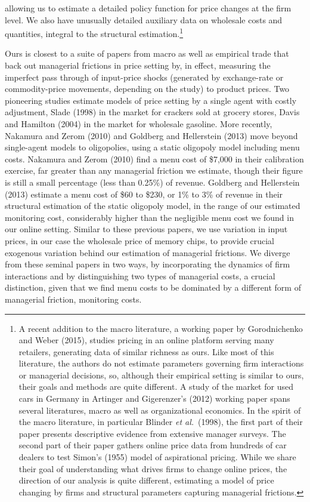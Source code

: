 \documentclass[11pt]{article}
\begin{document}
\begin{spacing}{1.3}
allowing us to estimate a detailed policy function for price changes
at the firm level. We also have unusually detailed auxiliary data on
wholesale costs and quantities, integral to the structural
estimation.\footnote{A recent addition to the macro literature, a
  working paper by Gorodnichenko and Weber (2015), studies pricing in
  an online platform serving many retailers, generating data of
  similar richness as ours. Like most of this literature, the authors
  do not estimate parameters governing firm interactions or managerial
  decisions, so, although their empirical setting is similar to ours,
  their goals and methods are quite different. A study of the market
  for used cars in Germany in Artinger and Gigerenzer's (2012) working
  paper spans several literatures, macro as well as organizational
  economics. In the spirit of the macro literature, in particular
  Blinder {\em et al.}\ (1998), the first part of their paper presents
  descriptive evidence from extensive manager surveys. The second part
  of their paper gathers online price data from hundreds of car
  dealers to test Simon's (1955) model of aspirational pricing. While
  we share their goal of understanding what drives firms to change
  online prices, the direction of our analysis is quite different,
  estimating a model of price changing by firms and structural
  parameters capturing managerial frictions.}

Ours is closest to a suite of papers from macro as well as empirical
trade that back out managerial frictions in price setting by, in
effect, measuring the imperfect pass through of input-price shocks
(generated by exchange-rate or commodity-price movements, depending on
the study) to product prices.  Two pioneering studies estimate models
of price setting by a single agent with costly adjustment, Slade
(1998) in the market for crackers sold at grocery stores, Davis and
Hamilton (2004) in the market for wholesale gasoline.  More recently,
Nakamura and Zerom (2010) and Goldberg and Hellerstein (2013) move
beyond single-agent models to oligopolies, using a static oligopoly
model including menu costs. Nakamura and Zerom (2010) find a menu cost
of \$7,000 in their calibration exercise, far greater than any
managerial friction we estimate, though their figure is still a small
percentage (less than 0.25\%) of revenue. Goldberg and Hellerstein
(2013) estimate a menu cost of \$60 to \$230, or 1\% to 3\% of revenue
in their structural estimation of the static oligopoly model, in the
range of our estimated monitoring cost, considerably higher than the
negligible menu cost we found in our online setting.  Similar to these
previous papers, we use variation in input prices, in our case the
wholesale price of memory chips, to provide crucial exogenous
variation behind our estimation of managerial frictions. We diverge
from these seminal papers in two ways, by incorporating the dynamics
of firm interactions and by distinguishing two types of managerial
costs, a crucial distinction, given that we find menu costs to be
dominated by a different form of managerial friction, monitoring
costs.


\end{spacing}
\end{document}
